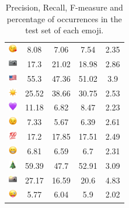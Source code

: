 \documentclass{article}
\begin{document}
\begin{table}
\begin{tabular}{|c|ccc|c|}
\includegraphics[height=0.37cm,width=0.37cm]{img/face_blowing_a_kiss.png} & 8.08 & 7.06 & 7.54 & 2.35\\ 
\includegraphics[height=0.37cm,width=0.37cm]{img/camera.png} & 17.3 & 21.02 & 18.98 & 2.86\\ 
\includegraphics[height=0.37cm,width=0.37cm]{img/United_States.png} & 55.3 & 47.36 & 51.02 & 3.9\\ 
\includegraphics[height=0.37cm,width=0.37cm]{img/sun.png} & 25.52 & 38.66 & 30.75 & 2.53\\ 
\includegraphics[height=0.37cm,width=0.37cm]{img/purple_heart.png} & 11.18 & 6.82 & 8.47 & 2.23\\ 
\includegraphics[height=0.37cm,width=0.37cm]{img/winking_face.png} & 7.33 & 5.67 & 6.39 & 2.61\\ 
\includegraphics[height=0.37cm,width=0.37cm]{img/hundred_points.png} & 17.2 & 17.85 & 17.51 & 2.49\\ 
\includegraphics[height=0.37cm,width=0.37cm]{img/beaming_face_with_smiling_eyes.png} & 6.81 & 6.59 & 6.7 & 2.31\\ 
\includegraphics[height=0.37cm,width=0.37cm]{img/Christmas_tree.png} & 59.39 & 47.7 & 52.91 & 3.09\\ 
\includegraphics[height=0.37cm,width=0.37cm]{img/camera_with_flash.png} & 27.17 & 16.59 & 20.6 & 4.83\\ 
\includegraphics[height=0.37cm,width=0.37cm]{img/winking_face_with_tongue.png} & 5.77 & 6.04 & 5.9 & 2.02\\ 

\hline
\end{tabular}
\caption{\label{table:emoji_detailed} Precision, Recall, F-measure and percentage of occurrences in the test set of each emoji.}
\end{table}
\end{document}

